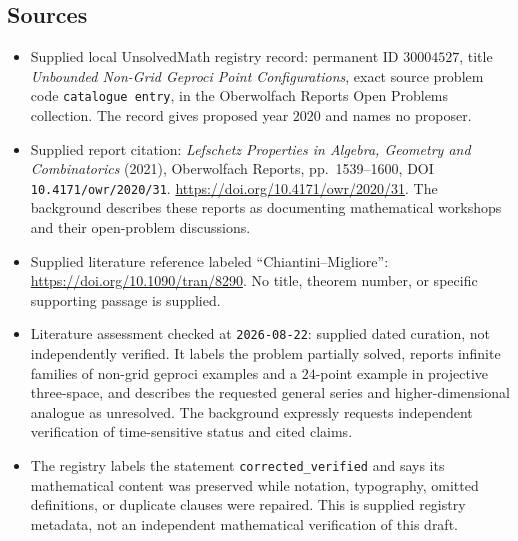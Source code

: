 \documentclass[11pt]{article}
\begin{document}
\subsection{Sources}
\begin{itemize}
\item Supplied local UnsolvedMath registry record: permanent ID \(30004527\), title \emph{Unbounded Non-Grid Geproci Point Configurations}, exact source problem code \texttt{catalogue entry}, in the Oberwolfach Reports Open Problems collection. The record gives proposed year \(2020\) and names no proposer.
\item Supplied report citation: \emph{Lefschetz Properties in Algebra, Geometry and Combinatorics} (2021), Oberwolfach Reports, pp.\ 1539--1600, DOI \texttt{10.4171/owr/2020/31}. \url{https://doi.org/10.4171/owr/2020/31}. The background describes these reports as documenting mathematical workshops and their open-problem discussions.
\item Supplied literature reference labeled ``Chiantini--Migliore'': \url{https://doi.org/10.1090/tran/8290}. No title, theorem number, or specific supporting passage is supplied.
\item Literature assessment checked at \texttt{2026-08-22}: supplied dated curation, not independently verified. It labels the problem partially solved, reports infinite families of non-grid geproci examples and a \(24\)-point example in projective three-space, and describes the requested general series and higher-dimensional analogue as unresolved. The background expressly requests independent verification of time-sensitive status and cited claims.
\item The registry labels the statement \texttt{corrected\_verified} and says its mathematical content was preserved while notation, typography, omitted definitions, or duplicate clauses were repaired. This is supplied registry metadata, not an independent mathematical verification of this draft.
\end{itemize}
\end{document}
